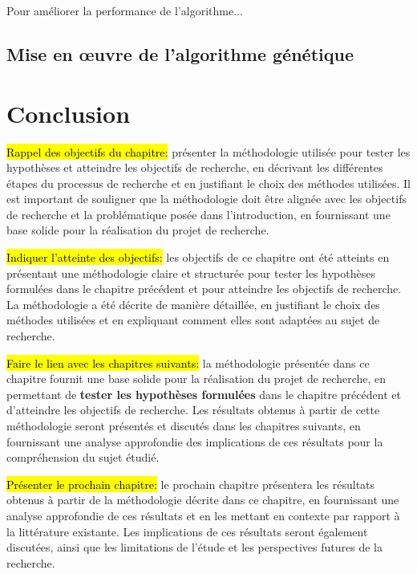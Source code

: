 Pour améliorer la performance de l'algorithme...



\subsection{Mise en œuvre de l'algorithme génétique} 

\section{Conclusion}
\hl{Rappel des objectifs du chapitre:} présenter la méthodologie utilisée pour tester les hypothèses et atteindre les objectifs de recherche, en décrivant les différentes étapes du processus de recherche et en justifiant le choix des méthodes utilisées. Il est important de souligner que la méthodologie doit être alignée avec les objectifs de recherche et la problématique posée dans l'introduction, en fournissant une base solide pour la réalisation du projet de recherche.
\par
\hl{Indiquer l'atteinte des objectifs:} les objectifs de ce chapitre ont été atteints en présentant une méthodologie claire et structurée pour tester les hypothèses formulées dans le chapitre précédent et pour atteindre les objectifs de recherche. La méthodologie a été décrite de manière détaillée, en justifiant le choix des méthodes utilisées et en expliquant comment elles sont adaptées au sujet de recherche.
\par
\hl{Faire le lien avec les chapitres suivants:} la méthodologie présentée dans ce chapitre fournit une base solide pour la réalisation du projet de recherche, en permettant de \textbf{tester les hypothèses formulées} dans le chapitre précédent et d'atteindre les objectifs de recherche. Les résultats obtenus à partir de cette méthodologie seront présentés et discutés dans les chapitres suivants, en fournissant une analyse approfondie des implications de ces résultats pour la compréhension du sujet étudié.
\par
\hl{Présenter le prochain chapitre:} le prochain chapitre présentera les résultats obtenus à partir de la méthodologie décrite dans ce chapitre, en fournissant une analyse approfondie de ces résultats et en les mettant en contexte par rapport à la littérature existante. Les implications de ces résultats seront également discutées, ainsi que les limitations de l'étude et les perspectives futures de la recherche.

